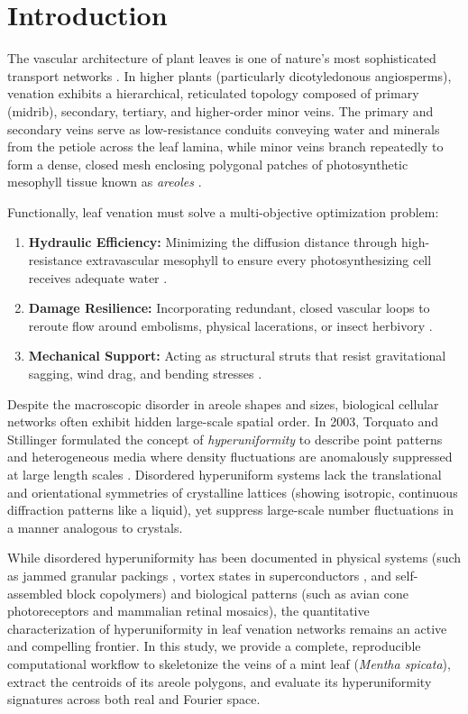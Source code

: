 \documentclass[10pt,twocolumn]{article}
\begin{document}
\section{Introduction}
The vascular architecture of plant leaves is one of nature's most sophisticated transport networks \cite{sack2013leaf, katifori2010damage}. In higher plants (particularly dicotyledonous angiosperms), venation exhibits a hierarchical, reticulated topology composed of primary (midrib), secondary, tertiary, and higher-order minor veins. The primary and secondary veins serve as low-resistance conduits conveying water and minerals from the petiole across the leaf lamina, while minor veins branch repeatedly to form a dense, closed mesh enclosing polygonal patches of photosynthetic mesophyll tissue known as \textit{areoles} \cite{roth2008leaf, corson2009turning}.

Functionally, leaf venation must solve a multi-objective optimization problem:
\begin{enumerate}
    \item \textbf{Hydraulic Efficiency:} Minimizing the diffusion distance through high-resistance extravascular mesophyll to ensure every photosynthesizing cell receives adequate water \cite{noblin2008optimal}.
    \item \textbf{Damage Resilience:} Incorporating redundant, closed vascular loops to reroute flow around embolisms, physical lacerations, or insect herbivory \cite{katifori2010damage}.
    \item \textbf{Mechanical Support:} Acting as structural struts that resist gravitational sagging, wind drag, and bending stresses \cite{moulia2006biomechanics}.
\end{enumerate}

Despite the macroscopic disorder in areole shapes and sizes, biological cellular networks often exhibit hidden large-scale spatial order. In 2003, Torquato and Stillinger formulated the concept of \textit{hyperuniformity} to describe point patterns and heterogeneous media where density fluctuations are anomalously suppressed at large length scales \cite{torquato2003local}. Disordered hyperuniform systems lack the translational and orientational symmetries of crystalline lattices (showing isotropic, continuous diffraction patterns like a liquid), yet suppress large-scale number fluctuations in a manner analogous to crystals.

While disordered hyperuniformity has been documented in physical systems (such as jammed granular packings \cite{torquato2018hyperuniform}, vortex states in superconductors \cite{le2019hyperuniformity}, and self-assembled block copolymers) and biological patterns (such as avian cone photoreceptors \cite{jiao2014avian} and mammalian retinal mosaics), the quantitative characterization of hyperuniformity in leaf venation networks remains an active and compelling frontier. In this study, we provide a complete, reproducible computational workflow to skeletonize the veins of a mint leaf (\textit{Mentha spicata}), extract the centroids of its areole polygons, and evaluate its hyperuniformity signatures across both real and Fourier space.
\end{document}
